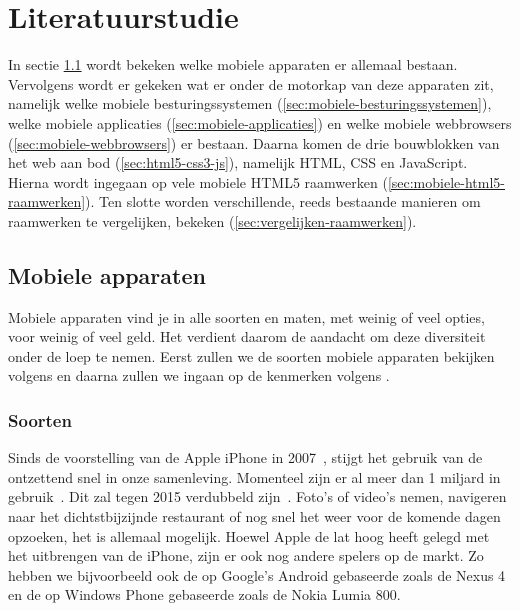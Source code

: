 
	

\chapter{Literatuurstudie}
\label{chap:literatuurstudie}
In sectie \ref{sec:mobiele-apparaten} wordt bekeken welke mobiele apparaten er allemaal bestaan. 
Vervolgens wordt er gekeken wat er onder de motorkap van deze apparaten zit, namelijk welke mobiele besturingssystemen (\ref{sec:mobiele-besturingssystemen}), welke mobiele applicaties (\ref{sec:mobiele-applicaties}) en welke mobiele webbrowsers (\ref{sec:mobiele-webbrowsers}) er bestaan. 
Daarna komen de drie bouwblokken van het web aan bod (\ref{sec:html5-css3-js}), namelijk HTML, CSS en JavaScript.
Hierna wordt ingegaan op vele mobiele HTML5 raamwerken (\ref{sec:mobiele-html5-raamwerken}).  
Ten slotte worden verschillende, reeds bestaande manieren om raamwerken te vergelijken, bekeken (\ref{sec:vergelijken-raamwerken}).



\section{Mobiele apparaten}
\label{sec:mobiele-apparaten}
Mobiele apparaten vind je in alle soorten en maten, met weinig of veel opties, voor weinig of veel geld. 
Het verdient daarom de aandacht om deze diversiteit onder de loep te nemen. 
Eerst zullen we de soorten mobiele apparaten bekijken volgens \cite{GCF2013} en daarna zullen we ingaan op de kenmerken volgens \cite{PhilDutson2012}.

\subsection{Soorten}
Sinds de voorstelling van de Apple iPhone in 2007~\cite{David2011}, stijgt het gebruik van de  ontzettend snel in onze samenleving.  
Momenteel zijn er al meer dan 1 miljard  in gebruik~\cite{Yang2012}. 
Dit zal tegen 2015 verdubbeld zijn~\cite{Gillett2012}.
Foto's of video's nemen, navigeren naar het dichtstbijzijnde restaurant of nog snel het weer voor de komende dagen opzoeken, het is allemaal mogelijk. 
Hoewel Apple de lat hoog heeft gelegd met het uitbrengen van de iPhone, zijn er ook nog andere spelers op de markt. 
Zo hebben we bijvoorbeeld ook de op Google's Android gebaseerde  zoals de Nexus 4 en de op Windows Phone gebaseerde  zoals de Nokia Lumia 800.

